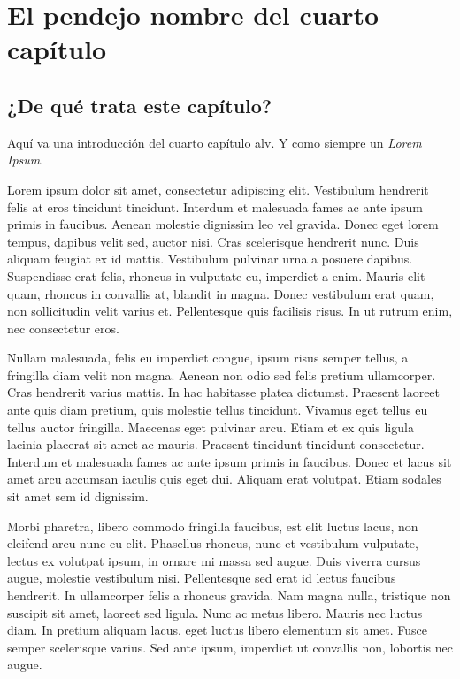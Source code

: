 
\chapter{El pendejo nombre del cuarto capítulo}
\label{capIV}



\section{¿De qué trata este capítulo?}

Aquí va una introducción del cuarto capítulo alv. Y como siempre un \textit{Lorem Ipsum}.


Lorem ipsum dolor sit amet, consectetur adipiscing elit. Vestibulum hendrerit felis at eros tincidunt tincidunt. Interdum et malesuada fames ac ante ipsum primis in faucibus. Aenean molestie dignissim leo vel gravida. Donec eget lorem tempus, dapibus velit sed, auctor nisi. Cras scelerisque hendrerit nunc. Duis aliquam feugiat ex id mattis. Vestibulum pulvinar urna a posuere dapibus. Suspendisse erat felis, rhoncus in vulputate eu, imperdiet a enim. Mauris elit quam, rhoncus in convallis at, blandit in magna. Donec vestibulum erat quam, non sollicitudin velit varius et. Pellentesque quis facilisis risus. In ut rutrum enim, nec consectetur eros.

Nullam malesuada, felis eu imperdiet congue, ipsum risus semper tellus, a fringilla diam velit non magna. Aenean non odio sed felis pretium ullamcorper. Cras hendrerit varius mattis. In hac habitasse platea dictumst. Praesent laoreet ante quis diam pretium, quis molestie tellus tincidunt. Vivamus eget tellus eu tellus auctor fringilla. Maecenas eget pulvinar arcu. Etiam et ex quis ligula lacinia placerat sit amet ac mauris. Praesent tincidunt tincidunt consectetur. Interdum et malesuada fames ac ante ipsum primis in faucibus. Donec et lacus sit amet arcu accumsan iaculis quis eget dui. Aliquam erat volutpat. Etiam sodales sit amet sem id dignissim.

Morbi pharetra, libero commodo fringilla faucibus, est elit luctus lacus, non eleifend arcu nunc eu elit. Phasellus rhoncus, nunc et vestibulum vulputate, lectus ex volutpat ipsum, in ornare mi massa sed augue. Duis viverra cursus augue, molestie vestibulum nisi. Pellentesque sed erat id lectus faucibus hendrerit. In ullamcorper felis a rhoncus gravida. Nam magna nulla, tristique non suscipit sit amet, laoreet sed ligula. Nunc ac metus libero. Mauris nec luctus diam. In pretium aliquam lacus, eget luctus libero elementum sit amet. Fusce semper scelerisque varius. Sed ante ipsum, imperdiet ut convallis non, lobortis nec augue.

